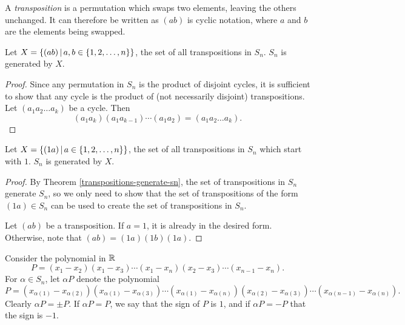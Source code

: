 \begin{defn}
    A \emph{transposition} is a permutation which swaps two elements, leaving the others unchanged. It can therefore be written as $(ab)$ is cyclic notation, where $a$ and $b$ are the elements being swapped.
\end{defn}

\begin{thm}\label{transpositions-generate-sn}
    Let $X = \left\{(ab) \,\middle|\, a, b \in \{1, 2, \ldots, n\}\right\}$, the set of all transpositions in $S_n$. $S_n$ is generated by $X$.
\end{thm}

\begin{proof}
    Since any permutation in $S_n$ is the product of disjoint cycles, it is sufficient to show that any cycle is the product of (not necessarily disjoint) transpositions. Let $(a_1a_2\ldots a_k)$ be a cycle. Then
    \[(a_1a_k)(a_1a_{k-1})\cdots(a_1a_2) = (a_1a_2\ldots a_k).\]
\end{proof}

\begin{thm}\label{one-transpositions-generate-sn}
    Let $X = \left\{(1a) \,\middle|\, a \in \{1, 2, \ldots, n\}\right\}$, the set of all transpositions in $S_n$ which start with $1$. $S_n$ is generated by $X$.
\end{thm}

\begin{proof}
    By Theorem \ref{transpositions-generate-sn}, the set of transpositions in $S_n$ generate $S_n$, so we only need to show that the set of transpositions of the form $(1a) \in S_n$ can be used to create the set of transpositions in $S_n$.

    Let $(ab)$ be a transposition. If $a = 1$, it is already in the desired form. Otherwise, note that $(ab) = (1a)(1b)(1a)$.
\end{proof}

\begin{defn}
    Consider the polynomial in $\mathbb{R}$
    \[P = (x_1 - x_2)(x_1 - x_3)\cdots(x_1 - x_n)(x_2 - x_3)\cdots(x_{n-1} - x_n).\]
    For $\alpha \in S_n$, let $\alpha P$ denote the polynomial
    \[P = (x_{\alpha(1)} - x_{\alpha(2)})(x_{\alpha(1)} - x_{\alpha(3)})\cdots(x_{\alpha(1)} - x_{\alpha(n)})(x_{\alpha(2)} - x_{\alpha(3)})\cdots(x_{\alpha(n-1)} - x_{\alpha(n)}).\]
    Clearly $\alpha P = \pm P$. If $\alpha P = P$, we say that the sign of $P$ is $1$, and if $\alpha P = -P$ that the sign is $-1$.
\end{defn}

